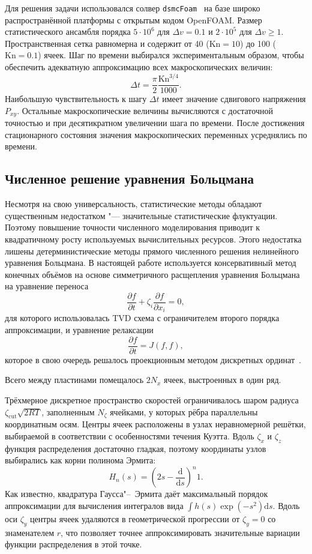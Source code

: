 \documentclass[a4paper,12pt]{article}
\newcommand{\Kn}{\mathrm{Kn}}
\newcommand{\dd}{\mathrm{d}}
\newcommand{\pder}[2][]{\frac{\partial#1}{\partial#2}}
\begin{document}
Для решения задачи использовался солвер \verb+dsmcFoam+~\cite{dsmcFoam2010}
на базе широко распространённой платформы с открытым кодом OpenFOAM\textregistered{}.
Размер статистического ансамбля порядка \(5\cdot10^6\) для \(\Delta{v}=0.1\)
и \(2\cdot10^5\) для \(\Delta{v}\ge1\).
Пространственная сетка равномерна и содержит от 40 (\(\Kn=10\)) до 100 (\(\Kn=0.1\)) ячеек.
Шаг по времени выбирался экспериментальным образом,
чтобы обеспечить адекватную аппроксимацию всех макроскопических величин:
\begin{equation}\label{eq:dsmc_timestep}
    \Delta{t} = \frac\pi2 \frac{\Kn^{3/4}}{1000}.
\end{equation}
Наибольшую чувствительность к шагу \(\Delta{t}\) имеет значение сдвигового напряжения \(P_{xy}\).
Остальные макроскопические величины вычисляются с достаточной точностью и при десятикратном увеличении шага по времени.
После достижения стационарного состояния значения макроскопических переменных усреднялись по времени.

\subsection{Численное решение уравнения Больцмана}

Несмотря на свою универсальность, статистические методы обладают существенным недостатком
"--- значительные статистические флуктуации. Поэтому повышение точности численного моделирования
приводит к квадратичному росту используемых вычислительных ресурсов.
Этого недостатка лишены детерминистические методы прямого численного решения нелинейного уравнения Больцмана.
В настоящей работе используется консервативный метод конечных объёмов на основе
симметричного расщепления уравнения Больцмана на уравнение переноса
\[ \pder[f]{t} + \zeta_i\pder[f]{x_i} = 0, \]
для которого использовалась TVD схема с ограничителем второго порядка аппроксимации,
и уравнение релаксации
\[ \pder[f]{t} = J(f,f), \]
которое в свою очередь решалось проекционным методом дискретных ординат~\cite{Tcheremissine2006}.

Всего между пластинами помещалось \(2N_x\) ячеек, выстроенных в один ряд.

Трёхмерное дискретное пространство скоростей ограничивалось шаром радиуса \(\zeta_\mathrm{cut}\sqrt{2RT}\),
заполненным \(N_\zeta\) ячейками, у которых рёбра параллельны координатным осям.
Центры ячеек расположены в узлах неравномерной решётки,
выбираемой в соответствии с особенностями течения Куэтта.
Вдоль \(\zeta_x\) и \(\zeta_z\) функция распределения достаточно гладкая,
поэтому координаты узлов выбирались как корни полинома Эрмита:
\begin{equation}
    H_n(s) = \left(2s-\frac{\dd}{\dd s}\right)^n 1.
\end{equation}
Как известно, квадратура Гаусса"--~Эрмита даёт максимальный порядок аппроксимации
для вычисления интегралов вида \(\int h(s)\exp(-s^2)\dd{s}\).
Вдоль оси \(\zeta_y\) центры ячеек удаляются в геометрической прогрессии от \(\zeta_y=0\)
со знаменателем \(r\), что позволяет точнее аппроксимировать значительные вариации функции распределения в этой точке.
\end{document}
